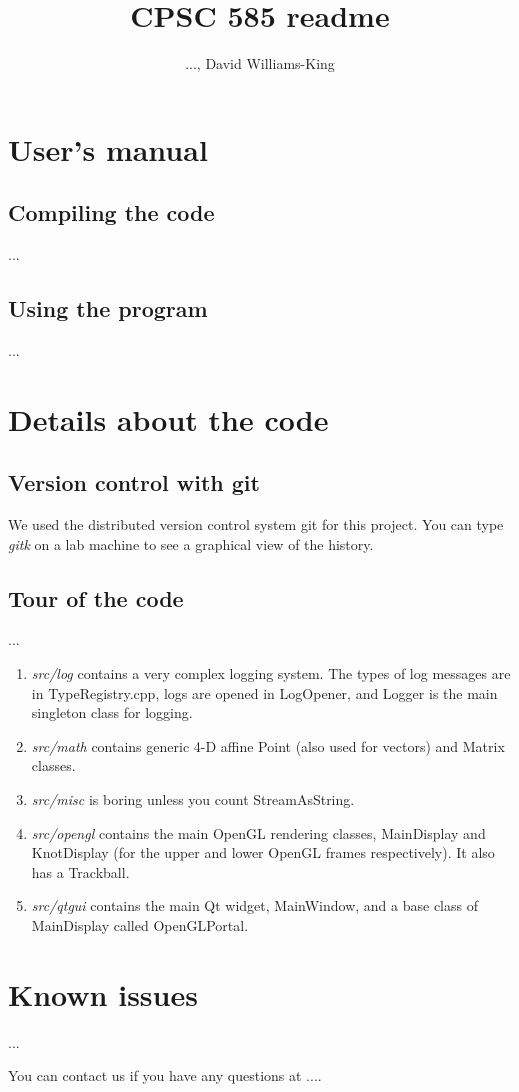 \documentclass{article}
\title{CPSC 585 readme}
\author{..., David Williams-King}
\begin{document}
\maketitle
\tableofcontents

\section{User's manual}

\subsection{Compiling the code}

...

\subsection{Using the program}

...

\section{Details about the code}

\subsection{Version control with git}

We used the distributed version control system git for this project. You can
type \emph{gitk} on a lab machine to see a graphical view of the history.

\subsection{Tour of the code}

...

\begin{enumerate}
    \item \emph{src/log} contains a very complex logging system. The types of
        log messages are in TypeRegistry.cpp, logs are opened in LogOpener, and
        Logger is the main singleton class for logging.
    \item \emph{src/math} contains generic 4-D affine Point (also used for
        vectors) and Matrix classes.
    \item \emph{src/misc} is boring unless you count StreamAsString.
    \item \emph{src/opengl} contains the main OpenGL rendering classes,
        MainDisplay and KnotDisplay (for the upper and lower OpenGL frames
        respectively). It also has a Trackball.
    \item \emph{src/qtgui} contains the main Qt widget, MainWindow, and a base
        class of MainDisplay called OpenGLPortal.
\end{enumerate}


\section{Known issues}

...

You can contact us if you have any questions at ....
\end{document}
